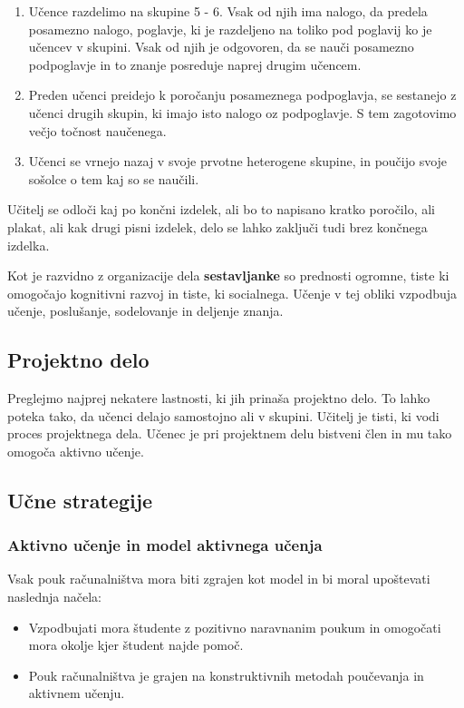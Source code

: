 \begin{description}
  \begin{enumerate}
  \item Učence razdelimo na skupine 5 - 6. Vsak od njih ima nalogo, da
    predela posamezno nalogo, poglavje, ki je razdeljeno na toliko pod
    poglavij ko je učencev v skupini. Vsak od njih je odgovoren, da se
    nauči posamezno podpoglavje in to znanje posreduje naprej drugim
    učencem.
  \item Preden učenci preidejo k poročanju posameznega podpoglavja, se
    sestanejo z učenci drugih skupin, ki imajo isto nalogo oz
    podpoglavje. S tem zagotovimo večjo točnost naučenega.
  \item Učenci se vrnejo nazaj v svoje prvotne heterogene skupine, in
    poučijo svoje sošolce o tem kaj so se naučili.
  \end{enumerate}
  Učitelj se odloči kaj po končni izdelek, ali bo to napisano kratko
  poročilo, ali plakat, ali kak drugi pisni izdelek, delo se lahko
  zaključi tudi brez končnega izdelka.

  Kot je razvidno z organizacije dela \textbf{sestavljanke} so
  prednosti ogromne, tiste ki omogočajo kognitivni razvoj in tiste, ki
  socialnega. Učenje v tej obliki vzpodbuja učenje, poslušanje,
  sodelovanje in deljenje znanja.
\end{description}

\subsection{Projektno delo}
\label{sec:projektno_delo}

Preglejmo najprej nekatere lastnosti, ki jih prinaša projektno
delo. To lahko poteka tako, da učenci delajo samostojno ali v
skupini. Učitelj je tisti, ki vodi proces projektnega dela. Učenec je
pri projektnem delu bistveni člen in mu tako omogoča aktivno učenje.

\subsection{Učne strategije}
\label{sec:učne_strategije}

\subsubsection{Aktivno učenje in model aktivnega učenja}
\label{sec:aktivno_učenje_in_model_aktivnega_učenja}

Vsak pouk računalništva mora biti zgrajen kot model in bi moral
upoštevati naslednja načela:
\begin{itemize}
\item Vzpodbujati mora študente z pozitivno naravnanim poukum in
   omogočati mora okolje kjer študent najde pomoč.
 \item Pouk računalništva je grajen na konstruktivnih metodah poučevanja
   in aktivnem učenju.
\end{itemize}

